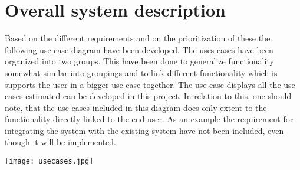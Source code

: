 \section{Overall system description}
Based on the different requirements and on the prioritization of these the following use case diagram have been developed. The uses cases have been organized into two groups. This have been done to generalize functionality somewhat similar into groupings and to link different functionality which is supports the user in a bigger use case together. The use case displays all the use cases estimated can be developed in this project. In relation to this, one should note, that the use cases included in this diagram does only extent to the functionality directly linked to the end user. As an example the requirement for integrating the system with the existing system have not been included, even though it will be implemented.

\texttt{[image: usecases.jpg]}

